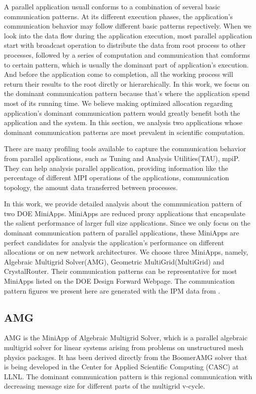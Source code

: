 \documentclass[conference]{IEEEtran}
\begin{document}
A parallel application usuall conforms to a combination of several basic communication patterns. At its different execution phases, the application's communication behavior may follow different basic patterns repectively. When we look into the data flow during the application execution, most parallel application start with broadcast operation to distribute the data from root process to other processes, followed by a series of computation and communication that comforms to certain pattern, which is usually the dominant part of application's execution. And before the application come to completion, all the working process will return their results to the root dirctly or hierarchically. In this work, we focus on the dominant communication pattern because that's where the application spend most of its running time. We believe making optimized allocation regarding application's dominant communication pattern would greatly benefit both the application and the system. In this section, we analysis two applications whose dominant communication patterns are most prevalent in scientific computation.

There are many profiling tools available to capture the communication behavior from parallel applications, such as Tuning and Analysis Utilities(TAU)\cite{tau}, mpiP\cite{mpip}. They can help analysis parallel application, providing information like the percentage of different MPI operations of the applications, communication topology, the amount data transferred between processes.

In this work, we provide detailed analysis about the communication pattern of two DOE MiniApps. MiniApps are reduced proxy applications that encapsulate the salient performance of larger full size applications\cite{miniapp}. Since we only focus on the dominant communication pattern of parallel applications, these MiniApps are perfect candidates for analysis the application's performance on different allocations or on new network architectures. We choose three MiniApps, namely, Algebraic Multigrid Solver(AMG), Geometric MultiGrid(MultiGrid) and CrystalRouter. Their communication patterns can be representative for most MiniApps listed on the DOE Design Forward Webpage\cite{design forward webpage}. The communication pattern figures we present here are generated with the IPM\cite{ipm} data from \cite{design forward webpage}.


\subsection{AMG}
\label{sec:amg}
AMG is the MiniApp of Algebraic Multigrid Solver, which is a parallel algebraic multigrid solver for linear systems arising from problems on unstructured mesh physics packages. It has been derived directly from the BoomerAMG solver that is being developed in the Center for Applied Scientific Computing (CASC) at LLNL\cite{amg}. The dominant communication pattern is this regional communication with decreasing message size for different parts of the multigrid v-cycle.
\end{document}
